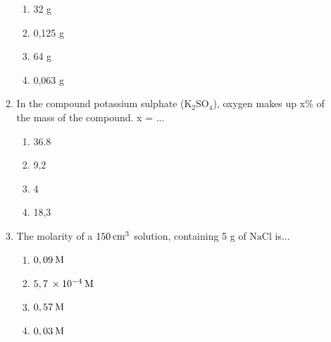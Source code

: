 \begin{enumerate}[noitemsep, label=\textbf{\arabic*}. ]
\begin{enumerate}[noitemsep, label=\textbf{\alph*}. ]
\label{m38712*id286339}\begin{enumerate}[noitemsep, label=\textbf{\alph*}. ] 
            \label{m38712*uid133}\item 32 g
\label{m38712*uid134}\item 0,125 g
\label{m38712*uid135}\item 64 g
\label{m38712*uid136}\item 0,063 g
\end{enumerate}
                \label{m38712*uid137}\item In the compound potassium sulphate (\begin{math}\mathrm{K}{}_{2}\mathrm{SO}{}_{4}\end{math}), oxygen makes up x\% of the mass of the compound. x = ...
\label{m38712*id286432}\begin{enumerate}[noitemsep, label=\textbf{\alph*}. ] 
            \label{m38712*uid138}\item 36.8
\label{m38712*uid139}\item 9,2
\label{m38712*uid140}\item 4
\label{m38712*uid141}\item 18,3
\end{enumerate}
                \label{m38712*uid142}\item The molarity of a \begin{math}150\phantom{\rule{2pt}{0ex}}{\mathrm{cm}}^{3}\end{math} solution, containing 5 g of \begin{math}\mathrm{NaCl}\end{math} is...
\label{m38712*id286512}\begin{enumerate}[noitemsep, label=\textbf{\alph*}. ] 
            \label{m38712*uid143}\item \begin{math}0,09\phantom{\rule{2pt}{0ex}}\mathrm{M}\end{math}
\label{m38712*uid144}\item \begin{math}5,7\phantom{\rule{2pt}{0ex}}\ensuremath{\times}10{}^{-4}\phantom{\rule{2pt}{0ex}}\mathrm{M}\end{math}
\label{m38712*uid145}\item \begin{math}0,57\phantom{\rule{2pt}{0ex}}\mathrm{M}\end{math}
\label{m38712*uid146}\item \begin{math}0,03\phantom{\rule{2pt}{0ex}}\mathrm{M}\end{math}

\end{enumerate}
\end{enumerate}
\end{enumerate}
